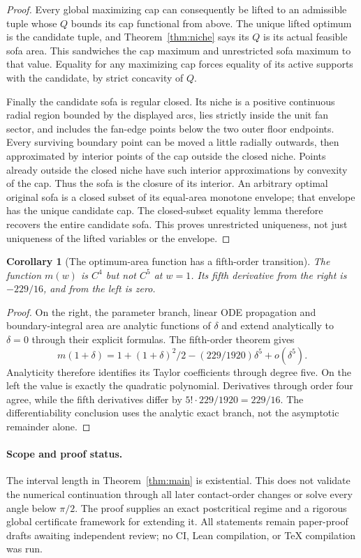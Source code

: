 \documentclass[11pt]{article}
\newtheorem{corollary}[theorem]{Corollary}
\begin{document}
\begin{proof}
Every global maximizing cap can consequently be lifted to an admissible tuple whose $Q$ bounds its cap functional from above. The unique lifted optimum is the candidate tuple, and Theorem~\ref{thm:niche} says its $Q$ is its actual feasible sofa area. This sandwiches the cap maximum and unrestricted sofa maximum to that value. Equality for any maximizing cap forces equality of its active supports with the candidate, by strict concavity of $Q$.

Finally the candidate sofa is regular closed. Its niche is a positive continuous radial region bounded by the displayed arcs, lies strictly inside the unit fan sector, and includes the fan-edge points below the two outer floor endpoints. Every surviving boundary point can be moved a little radially outwards, then approximated by interior points of the cap outside the closed niche. Points already outside the closed niche have such interior approximations by convexity of the cap. Thus the sofa is the closure of its interior. An arbitrary optimal original sofa is a closed subset of its equal-area monotone envelope; that envelope has the unique candidate cap. The closed-subset equality lemma therefore recovers the entire candidate sofa. This proves unrestricted uniqueness, not just uniqueness of the lifted variables or the envelope.
\end{proof}

\begin{corollary}[The optimum-area function has a fifth-order transition]
The function $m(w)$ is $C^4$ but not $C^5$ at $w=1$. Its fifth derivative from the right is $-229/16$, and from the left is zero.
\end{corollary}
\begin{proof}
On the right, the parameter branch, linear ODE propagation and boundary-integral area are analytic functions of $\delta$ and extend analytically to $\delta=0$ through their explicit formulas. The fifth-order theorem gives
\[
 m(1+\delta)=1+(1+\delta)^2/2-(229/1920)\delta^5+o(\delta^5).
\]
Analyticity therefore identifies its Taylor coefficients through degree five. On the left the value is exactly the quadratic polynomial. Derivatives through order four agree, while the fifth derivatives differ by $5!\cdot229/1920=229/16$. The differentiability conclusion uses the analytic exact branch, not the asymptotic remainder alone.
\end{proof}

\paragraph{Scope and proof status.}
The interval length in Theorem~\ref{thm:main} is existential. This does not validate the numerical continuation through all later contact-order changes or solve every angle below $\pi/2$. The proof supplies an exact postcritical regime and a rigorous global certificate framework for extending it. All statements remain paper-proof drafts awaiting independent review; no CI, Lean compilation, or TeX compilation was run.
\end{document}
